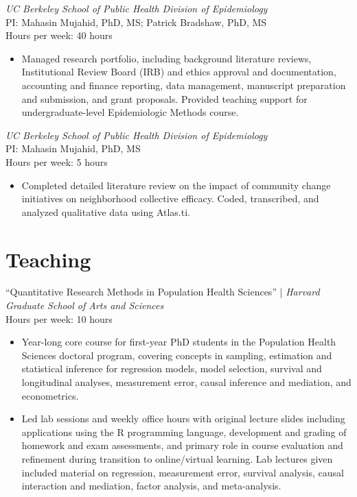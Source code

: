 \documentclass{cv_style}
\begin{document}
\textit{UC Berkeley School of Public Health Division of Epidemiology} \\
PI: Mahasin Mujahid, PhD, MS; Patrick Bradshaw, PhD, MS\\
Hours per week: 40 hours
\begin{itemize}
    \item Managed research portfolio, including background literature reviews, Institutional Review Board (IRB) and ethics approval and documentation, accounting and finance reporting, data management, manuscript preparation and submission, and grant proposals. Provided teaching support for undergraduate-level Epidemiologic Methods course.
\end{itemize}

\textit{UC Berkeley School of Public Health Division of Epidemiology} \\
PI: Mahasin Mujahid, PhD, MS\\
Hours per week: 5 hours
\begin{itemize}
    \item Completed detailed literature review on the impact of community change initiatives on neighborhood collective efficacy. Coded, transcribed, and analyzed qualitative data using Atlas.ti.
\end{itemize}


\parskip -5pt 
\section{Teaching}

``Quantitative Research Methods in Population Health Sciences'' | \textit{Harvard Graduate School of Arts and Sciences}\\
Hours per week: 10 hours
\begin{itemize}
  \vspace{0em} \item Year-long core course for first-year PhD students in the Population Health Sciences doctoral program, covering concepts in sampling, estimation and statistical inference for regression models, model selection, survival and longitudinal analyses, measurement error, causal inference and mediation, and econometrics. 
  \item \parskip 1pt Led lab sessions and weekly office hours with original lecture slides including applications using the R programming language, development and grading of homework and exam assessments, and primary role in course evaluation and refinement during transition to online/virtual learning. Lab lectures given included material on regression, measurement error, survival analysis, causal interaction and mediation, factor analysis, and meta-analysis.
\end{itemize}
\end{document}
